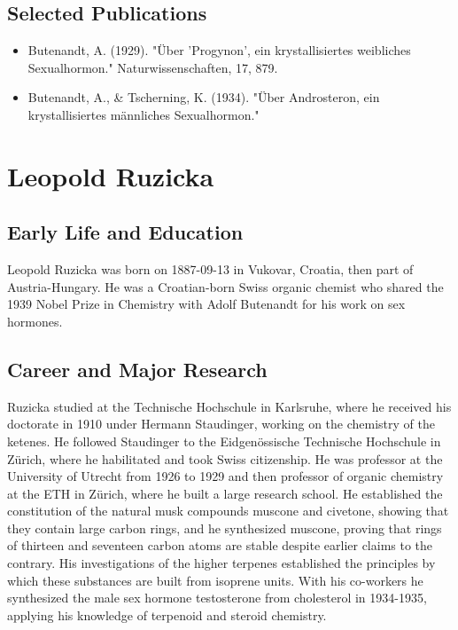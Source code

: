 \subsection*{Selected Publications}

\begin{itemize}

\item Butenandt, A. (1929). "Über 'Progynon', ein krystallisiertes weibliches Sexualhormon." Naturwissenschaften, 17, 879.

\item Butenandt, A., \& Tscherning, K. (1934). "Über Androsteron, ein krystallisiertes männliches Sexualhormon."

\end{itemize}

\clearpage

\section{Leopold Ruzicka}

\subsection*{Early Life and Education}

Leopold Ruzicka was born on 1887-09-13 in Vukovar, Croatia, then part of Austria-Hungary.
He was a Croatian-born Swiss organic chemist who shared the 1939 Nobel Prize in Chemistry with Adolf Butenandt for his work on sex hormones.

\subsection*{Career and Major Research}

Ruzicka studied at the Technische Hochschule in Karlsruhe, where he received his doctorate in 1910 under Hermann Staudinger, working on the chemistry of the ketenes.
He followed Staudinger to the Eidgenössische Technische Hochschule in Zürich, where he habilitated and took Swiss citizenship.
He was professor at the University of Utrecht from 1926 to 1929 and then professor of organic chemistry at the ETH in Zürich, where he built a large research school.
He established the constitution of the natural musk compounds muscone and civetone, showing that they contain large carbon rings, and he synthesized muscone, proving that rings of thirteen and seventeen carbon atoms are stable despite earlier claims to the contrary.
His investigations of the higher terpenes established the principles by which these substances are built from isoprene units.
With his co-workers he synthesized the male sex hormone testosterone from cholesterol in 1934-1935, applying his knowledge of terpenoid and steroid chemistry.

